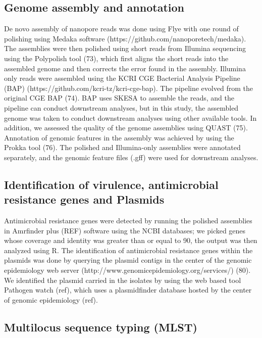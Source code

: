 \documentclass[preprint, 3p,
authoryear]{elsarticle} %
\begin{document}
\subsection{Genome assembly and
annotation}\label{genome-assembly-and-annotation}

De novo assembly of nanopore reads was done using Flye with one round of
polishing using Medaka software
(https://github.com/nanoporetech/medaka). The assemblies were then
polished using short reads from Illumina sequencing using the Polypolish
tool (73), which first aligns the short reads into the assembled genome
and then corrects the error found in the assembly. Illumina only reads
were assembled using the KCRI CGE Bacterial Analysis Pipeline (BAP)
(https://github.com/kcri-tz/kcri-cge-bap). The pipeline evolved from the
original CGE BAP (74). BAP uses SKESA to assemble the reads, and the
pipeline can conduct downstream analyses, but in this study, the
assembled genome was taken to conduct downstream analyses using other
available tools. In addition, we assessed the quality of the genome
assemblies using QUAST (75). Annotation of genomic features in the
assembly was achieved by using the Prokka tool (76). The polished and
Illumina-only assemblies were annotated separately, and the genomic
feature files (.gff) were used for downstream analyses.

\subsection{Identification of virulence, antimicrobial resistance genes
and
Plasmids}\label{identification-of-virulence-antimicrobial-resistance-genes-and-plasmids}

Antimicrobial resistance genes were detected by running the polished
assemblies in Amrfinder plus (REF) software using the NCBI databases; we
picked genes whose coverage and identity was greater than or equal to
90, the output was then analyzed using R. The identification of
antimicrobial resistance genes within the plasmids was done by querying
the plasmid contigs in the center of the genomic epidemiology web server
(http://www.genomicepidemiology.org/services/) (80). We identified the
plasmid carried in the isolates by using the web based tool Pathogen
watch (ref), which uses a plasmidfinder database hosted by the center of
genomic epidemiology (ref).

\subsection{Multilocus sequence typing
(MLST)}\label{multilocus-sequence-typing-mlst}
\end{document}

